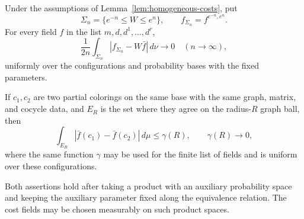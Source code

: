 \begin{lemma}
\label{lem:strip-locality}
Under the assumptions of Lemma~\ref{lem:homogeneous-costs}, put
\[
 \Sigma_n=\{e^{-n}\leq W\leq e^n\},
 \qquad f_{\Sigma_n}=f^{e^{-n},e^n}.
\]
For every field $f$ in the list $m,d,d^1,\ldots,d^r$,
\begin{equation}
 \frac1{2n}\int_{\Sigma_n}
       |f_{\Sigma_n}-W\bar f|\,d\nu\longrightarrow0
 \quad(n\to\infty),
 \label{eq:coloring-strip}
\end{equation}
uniformly over the configurations and probability bases with the fixed
parameters.

If $c_1,c_2$ are two partial colorings on the same base with the same graph,
matrix, and cocycle data, and $E_R$ is the set where they agree on the
radius-$R$ graph ball, then
\begin{equation}
 \int_{E_R}|\bar f(c_1)-\bar f(c_2)|\,d\mu
      \leq\gamma(R),
 \qquad \gamma(R)\longrightarrow0,
 \label{eq:coloring-locality}
\end{equation}
where the same function $\gamma$ may be used for the finite list of fields
and is uniform over these configurations.

Both assertions hold after taking a product with an auxiliary probability
space and keeping the auxiliary parameter fixed along the equivalence
relation.  The cost fields may be chosen measurably on such product spaces.
\end{lemma}

